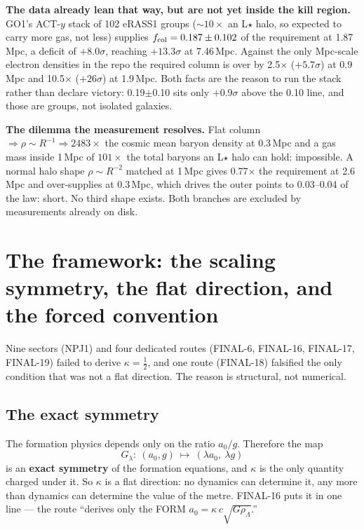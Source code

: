 \documentclass[10pt]{article}
\begin{document}
{\bf The data already lean that way, but are not yet inside the kill region.} GO1's ACT-$y$ stack of 102 eRASS1
groups ($\sim10\times$ an L$\star$ halo, so expected to carry more gas, not less) supplies $f_{\rm col}=0.187\pm0.102$
of the requirement at 1.87\,Mpc, a deficit of $+8.0\sigma$, reaching $+13.3\sigma$ at 7.46\,Mpc. Against the only
Mpc-scale electron densities in the repo the required column is over by 2.5$\times$ ($+5.7\sigma$) at 0.9\,Mpc
and 10.5$\times$ ($+26\sigma$) at 1.9\,Mpc. Both facts are the reason to run the stack rather than declare
victory: 0.19$\pm$0.10 sits only $+0.9\sigma$ above the 0.10 line, and those are groups, not isolated galaxies.

{\bf The dilemma the measurement resolves.} Flat column $\Rightarrow\rho\sim R^{-1}\Rightarrow2483\times$ the
cosmic mean baryon density at 0.3\,Mpc and a gas mass inside 1\,Mpc of $101\times$ the total baryons an L$\star$
halo can hold: impossible. A normal halo shape $\rho\sim R^{-2}$ matched at 1\,Mpc gives 0.77$\times$ the
requirement at 2.6\,Mpc and over-supplies at 0.3\,Mpc, which drives the outer points to 0.03--0.04 of the law:
short. No third shape exists. Both branches are excluded by measurements already on disk.

\section{The framework: the scaling symmetry, the flat direction, and the forced convention}
\label{sec:framework}

Nine sectors (NPJ1) and four dedicated routes (FINAL-6, FINAL-16, FINAL-17, FINAL-19) failed to derive
$\kappa=\tfrac12$, and one route (FINAL-18) falsified the only condition that was not a flat direction. The
reason is structural, not numerical.

\subsection{The exact symmetry}
The formation physics depends only on the ratio $a_0/g$. Therefore the map
\[
  G_\lambda:\ (a_0,g)\ \mapsto\ (\lambda a_0,\ \lambda g)
\]
is an {\bf exact symmetry} of the formation equations, and $\kappa$ is the only quantity charged under it. So
$\kappa$ is a flat direction: no dynamics can determine it, any more than dynamics can determine the value of
the metre. FINAL-16 puts it in one line --- the route ``derives only the FORM $a_0=\kappa\,c\sqrt{G\rho_\Lambda}$.''
\end{document}
